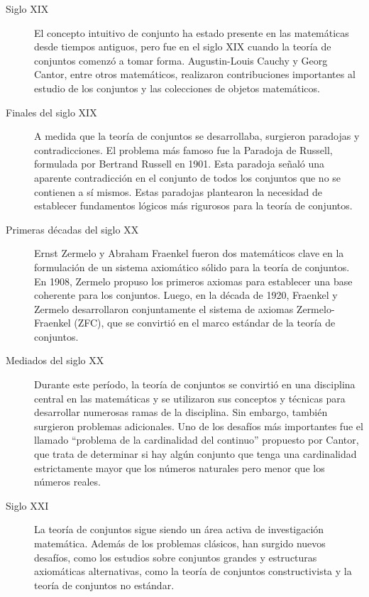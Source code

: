 \begin{description}
	\item[Siglo XIX] El concepto intuitivo de conjunto ha estado presente en las matemáticas desde tiempos antiguos, pero fue en el siglo XIX cuando la teoría de conjuntos comenzó a tomar forma. Augustin-Louis Cauchy y Georg Cantor, entre otros matemáticos, realizaron contribuciones importantes al estudio de los conjuntos y las colecciones de objetos matemáticos.
	
	\item[Finales del siglo XIX] A medida que la teoría de conjuntos se desarrollaba, surgieron paradojas y contradicciones. El problema más famoso fue la Paradoja de Russell, formulada por Bertrand Russell en 1901. Esta paradoja señaló una aparente contradicción en el conjunto de todos los conjuntos que no se contienen a sí mismos. Estas paradojas plantearon la necesidad de establecer fundamentos lógicos más rigurosos para la teoría de conjuntos.
	
	\item[Primeras décadas del siglo XX] Ernst Zermelo y Abraham Fraenkel fueron dos matemáticos clave en la formulación de un sistema axiomático sólido para la teoría de conjuntos. En 1908, Zermelo propuso los primeros axiomas para establecer una base coherente para los conjuntos. Luego, en la década de 1920, Fraenkel y Zermelo desarrollaron conjuntamente el sistema de axiomas Zermelo-Fraenkel (ZFC), que se convirtió en el marco estándar de la teoría de conjuntos.
	
	\item[Mediados del siglo XX] Durante este período, la teoría de conjuntos se convirtió en una disciplina central en las matemáticas y se utilizaron sus conceptos y técnicas para desarrollar numerosas ramas de la disciplina. Sin embargo, también surgieron problemas adicionales. Uno de los desafíos más importantes fue el llamado “problema de la cardinalidad del continuo” propuesto por Cantor, que trata de determinar si hay algún conjunto que tenga una cardinalidad estrictamente mayor que los números naturales pero menor que los números reales.
	
	\item[Siglo XXI] La teoría de conjuntos sigue siendo un área activa de investigación matemática. Además de los problemas clásicos, han surgido nuevos desafíos, como los estudios sobre conjuntos grandes y estructuras axiomáticas alternativas, como la teoría de conjuntos constructivista y la teoría de conjuntos no estándar.
\end{description}

